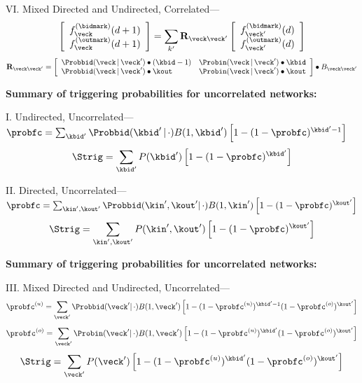 \begin{frame}[plain]
    VI. Mixed Directed and Undirected, Correlated---
    $$
    \left[
    \begin{array}{c}
    f_{\veck}^{\textnormal{(\bidmark)}}(d+1) \\
    f_{\veck}^{\textnormal{(\outmark)}}(d+1)
    \end{array}
    \right]
    =
    \sum_{k'}
    \textbf{R}_{\veck\veck'}
    \left[
    \begin{array}{c}
    f_{\veck'}^{\textnormal{(\bidmark)}}(d) \\
    f_{\veck'}^{\textnormal{(\outmark)}}(d)
    \end{array}
    \right]
    $$
    $$
    \textbf{R}_{\veck\veck'}
    = 
    \left[
    \begin{array}{ll}
      \Probbid(\veck\,|\, \veck')
      \bullet
      (\kbid-1)
      &
      \Probin(\veck\,|\, \veck')
      \bullet
      \kbid
      \\
      \Probbid(\veck\,|\, \veck')
      \bullet
      \kout
      &
      \Probin(\veck\,|\, \veck')
      \bullet
      \kout
    \end{array}
    \right]
    \bullet
    B_{\veck\veck'}
    $$
  



  \small
  \textbf{Summary of triggering probabilities for uncorrelated networks:\cite{dodds2011c}}
    
    
    I. Undirected, Uncorrelated---
    $
    \probfc = 
    \sum_{\kbid'}
    \Probbid(\kbid'\, | \, \cdot)
    B(1,\kbid')
    \left[
      1
      -
      (1-\probfc)^{\kbid'-1}
    \right]
    $
    $$
    \Strig
    =
    \sum_{\kbid'}
    P(\kbid')
    \left[
      1 - (1-\probfc)^{\kbid'}
    \right]
    $$
  
    II. Directed, Uncorrelated---
    $
    \probfc = 
    \sum_{\kin',\kout'}
    \Probbid(\kin',\kout' | \, \cdot)
    B(1,\kin')
    \left[
      1
      -
      (1-\probfc)^{\kout'}
    \right]
    $
    $$
    \Strig
    =
    \sum_{\kin',\kout'}
    P(\kin',\kout')
    \left[
      1 - (1-\probfc)^{\kout'}
    \right]
    $$
  
  

  \small
  \textbf{Summary of triggering probabilities for uncorrelated networks:}
    
  
    III. Mixed Directed and Undirected, Uncorrelated---
    $$
    \probfc^{(u)} 
    = 
    \sum_{\veck'}
    \Probbid(\veck' | \, \cdot)
    B(1,\veck')
    \left[
      1
      -
      (1-\probfc^{(u)})^{\kbid'-1}
      (1-\probfc^{(o)})^{\kout'}
    \right]
    $$
    $$
    \probfc^{(o)} 
    = 
    \sum_{\veck'}
    \Probin(\veck' | \, \cdot)
    B(1,\veck')
    \left[
      1
      -
      (1-\probfc^{(u)})^{\kbid'}
      (1-\probfc^{(o)})^{\kout'}
    \right]
    $$
    $$
    \Strig
    =
    \sum_{\veck'}
    P(\veck')
    \left[
      1 - (1-\probfc^{(u)})^{\kbid'}(1-\probfc^{(o)})^{\kout'}
    \right]
    $$
  

\end{frame}

